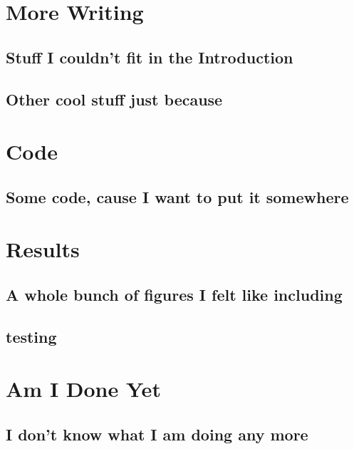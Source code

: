 \chapter{More Writing}

\section{Stuff I couldn't fit in the Introduction}

\section{Other cool stuff just because}

\chapter{Code}

\section{Some code, cause I want to put it somewhere}

\chapter{Results}

\section{A whole bunch of figures I felt like including}
\pagebreak
\section{testing}

\chapter{Am I Done Yet}

\section{I don't know what I am doing any more}

